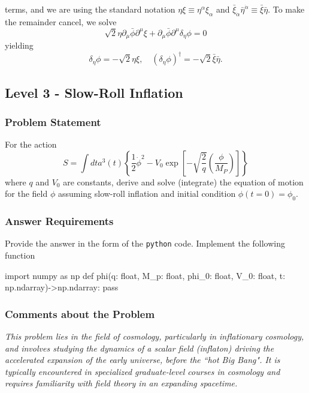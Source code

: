 terms, and we are using the standard notation $\eta\xi\equiv\eta^{\alpha}\xi_{\alpha}$
and $\bar{\xi}_{\dot{\alpha}}\bar{\eta}^{\dot{\alpha}}\equiv\bar{\xi}\bar{\eta}$.
To make the remainder cancel, we solve
\begin{equation}
\sqrt{2}\eta\partial_{\mu}\bar{\phi}\partial^{\mu}\xi+\partial_{\mu}\bar{\phi}\partial^{\mu}\delta_{\eta}\phi=0
\end{equation}
yielding
\begin{equation}
\boxed{\delta_{\eta}\phi=-\sqrt{2}\eta\xi,\quad\left(\delta_{\eta}\phi\right)^{\dagger}=-\sqrt{2}\bar{\xi}\bar{\eta}}.\label{eq:L4-susy}
\end{equation}





\clearpage


\subsection{Level 3 - Slow-Roll Inflation}


\subsubsection*{Problem Statement}
For the action
\begin{equation}
S = \int dt a^3(t) \left\{ \frac{1}{2} \dot{\phi}^2 - V_0 \exp \left[ - \sqrt{\frac{2}{q}} \left( \frac{\phi}{M_P} \right) \right] \right\}
\end{equation}
where \( q \) and \(V_0\) are constants, derive and solve (integrate) the equation of motion for the field $\phi$ assuming slow-roll inflation and initial condition $\phi(t=0) = \phi_0$.

\subsubsection*{Answer Requirements}
Provide the answer in the form of the \texttt{python} code. Implement the following function 
\begin{python}
import numpy as np
def phi(q: float, M_p: float, phi_0: float, V_0: float, t: np.ndarray)->np.ndarray:
    pass
\end{python}

\subsubsection*{Comments about the Problem}
\textit{This problem lies in the field of cosmology, particularly in inflationary cosmology, and involves studying the dynamics of a scalar field (inflaton) driving the accelerated expansion of the early universe, before the ``hot Big Bang". It is typically encountered in specialized graduate-level courses in cosmology and requires familiarity with field theory in an expanding spacetime.}

